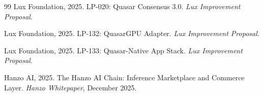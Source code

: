 \begin{thebibliography}{99}
Lux Foundation, 2025. LP-020: Quasar Consensus 3.0. \textit{Lux Improvement Proposal}.

Lux Foundation, 2025. LP-132: QuasarGPU Adapter. \textit{Lux Improvement Proposal}.

Lux Foundation, 2025. LP-133: Quasar-Native App Stack. \textit{Lux Improvement Proposal}.

Hanzo AI, 2025. The Hanzo AI Chain: Inference Marketplace and Commerce Layer. \textit{Hanzo Whitepaper}, December 2025.

\end{thebibliography}

